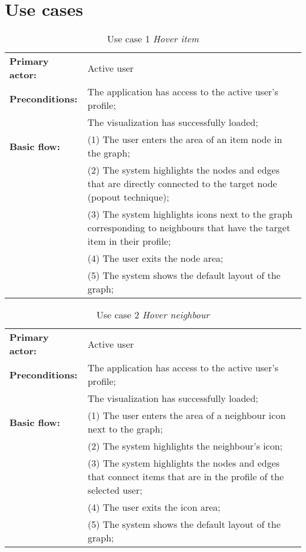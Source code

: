 
\chapter{Use cases}\label{appendix:use_cases}

\begin{table}[h]
\caption{Use case 1 \textit{Hover item}}
\begin{center}
	\begin{tabular}{ l p{300px} } %
		\hline
		\textbf{Primary actor:}	& Active user \\
		\textbf{Preconditions:}	& The application has access to the active user's profile; \\
														& The visualization has successfully loaded; \\
		\textbf{Basic flow:}	& (1) The user enters the area of an item node in the graph; \\
													& (2) The system highlights the nodes and edges that are directly connected to the target node (popout technique); \\
													& (3) The system highlights icons next to the graph corresponding to neighbours that have the target item in their profile; \\
													& (4) The user exits the node area; \\
													& (5) The system shows the default layout of the graph; \\
		\hline
	\end{tabular}
\end{center}
\label{tab:use_case1}
\end{table}



\begin{table}[h]
\caption{Use case 2 \textit{Hover neighbour}}
\begin{center}
	\begin{tabular}{ l p{300px} }
		\hline
		\textbf{Primary actor:}	& Active user \\
		\textbf{Preconditions:}	& The application has access to the active user's profile; \\
														& The visualization has successfully loaded; \\
		\textbf{Basic flow:}	& (1) The user enters the area of a neighbour icon next to the graph; \\
													& (2) The system highlights the neighbour's icon; \\
													& (3) The system highlights the nodes and edges that connect items that are in the profile of the selected user; \\
													& (4) The user exits the icon area; \\
													& (5) The system shows the default layout of the graph; \\
		\hline
	\end{tabular}
\end{center}
\label{tab:use_case2}
\end{table}



